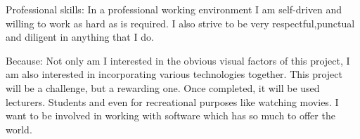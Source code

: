 \inlineheadsection
  {Professional skills:}
  {In a professional working environment I am self-driven and willing to work as hard as is required. I also strive to be very respectful,punctual and diligent in anything that I do.}
  
\spacedhrule{1.6em}{-0.4em}  
  

\inlineheadsection
  {Because:}
  {Not only am I interested in the obvious visual factors of this project, I am also interested in incorporating various technologies together. This project will be a challenge, but a rewarding one. Once completed, it will be used lecturers. Students and even for recreational purposes like watching movies. I want to be involved in working with software which has so much to offer the world. }